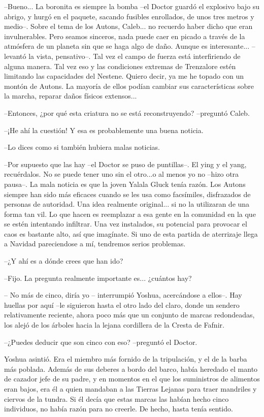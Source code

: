 --Bueno... La boronita es siempre la bomba --el Doctor guardó el explosivo bajo su abrigo, y hurgó en el paquete, sacando fusibles enrollados, de unos tres metros y medio--. Sobre el tema de los Autons, Caleb... no recuerdo haber dicho que eran invulnerables. Pero seamos sinceros, nada puede caer en picado a través de la atmósfera de un planeta sin que se haga algo de daño. Aunque es interesante... --levantó la vista, pensativo--. Tal vez el campo de fuerza está interfiriendo de alguna manera. Tal vez eso y las condiciones extremas de Trenzalore estén limitando las capacidades del Nestene. Quiero decir, ya me he topado con un montón de Autons. La mayoría de ellos podían cambiar sus características sobre la marcha, reparar daños físicos extensos...
 
--Entonces, ¿por qué esta criatura no se está reconstruyendo? --preguntó Caleb.
 
--¡He ahí la cuestión! Y esa es probablemente una buena noticia.
 
--Lo dices como si también hubiera malas noticias.
 
--Por supuesto que las hay --el Doctor se puso de puntillas--. El ying y el yang, recuérdalos. No se puede tener uno sin el otro...o al menos yo no --hizo otra pausa--. La mala noticia es que la joven Yalala Gluck tenía razón. Los Autons siempre han sido más eficaces cuando se les usa como facsímiles, disfrazados de personas de autoridad. Una idea realmente original... si no la utilizaran de una forma tan vil. Lo que hacen es reemplazar a esa gente en la comunidad en la que se estén intentando infiltrar. Una vez instalados, su potencial para provocar el caos es bastante alto, así que imagínate. Si uno de esta partida de aterrizaje llega a Navidad pareciendose a mí, tendremos serios problemas.
 
--¿Y ahí es a dónde crees que han ido?
 
--Fijo. La pregunta realmente importante es... ¿cuántos hay?
 
-- No más de cinco, diría yo -- interrumpió Yoshua, acercándose a ellos--. Hay huellas por aquí --le siguieron hasta el otro lado del claro, donde un sendero relativamente reciente, ahora poco más que un conjunto de marcas redondeadas, los alejó de los árboles hacia la lejana cordillera de la Cresta de Fafnir.
 
--¿Puedes deducir que son cinco con eso? --preguntó el Doctor.
 
Yoshua asintió. Era el miembro más fornido de la tripulación, y el de la barba más poblada. Además de sus deberes a bordo del barco, había heredado el manto de cazador jefe de su padre, y en momentos en el que los suministros de alimentos eran bajos, era él a quien mandaban a las Tierras Lejanas para traer mandriles y ciervos de la tundra. Si él decía que estas marcas las habían hecho cinco individuos, no había razón para no creerle. De hecho, hasta tenía sentido.
 
